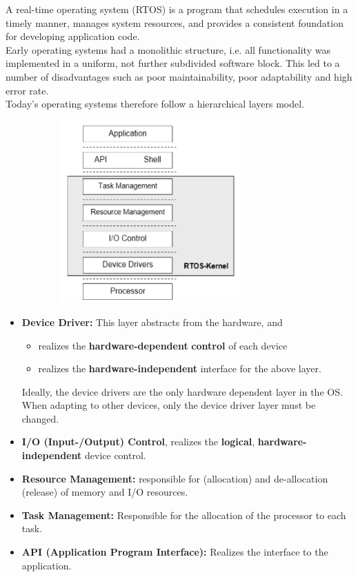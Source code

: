 A real-time operating system (RTOS) is a program that schedules execution in a timely manner, manages system resources, and provides a consistent foundation for developing application code.\\

Early operating systems had a monolithic structure, i.e. all functionality was implemented in a uniform, not further subdivided software block. This led to a number of disadvantages such as poor maintainability, poor adaptability and high error rate.\\

Today's operating systems therefore follow a hierarchical layers model. 

	\begin{figure}[h]
    \centering
    \includegraphics[width=9cm, height=7cm]{Images/image79.png}
    \label{fig:Fig 25}
    \end{figure}

\begin{itemize}
	\item  \textbf{Device Driver: } This layer abstracts from the hardware, and
	\begin{itemize}
		\item realizes the \textbf{hardware-dependent} \textbf{control} of each device
		\item realizes the \textbf{hardware-independent} interface for the above layer. 
	\end{itemize}

		Ideally, the device drivers are the only hardware dependent layer in the OS. When adapting to other devices, only the device driver layer must be changed.
	\item  \textbf{I/O (Input-/Output) Control}, realizes the \textbf{logical}, \textbf{hardware-independent} device control. 
	\item  \textbf{Resource Management: } responsible for (allocation) and de-allocation (release) of memory and I/O resources.
	\item  \textbf{Task Management: } Responsible for the allocation of the processor to each task. 
	\item  \textbf{API (Application Program Interface): } Realizes the interface to the application.
\end{itemize}

